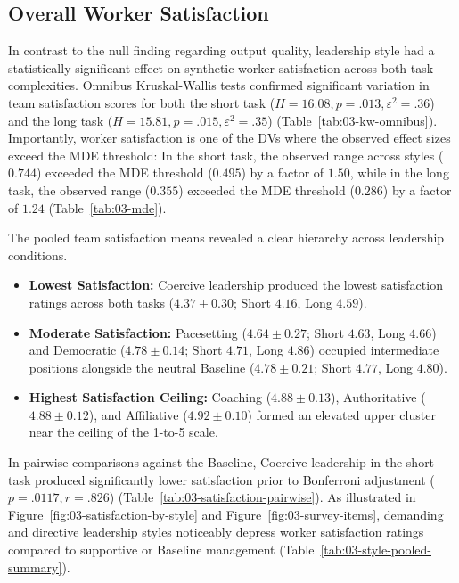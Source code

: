 \subsection{Overall Worker Satisfaction}
\label{subsec:overall-worker-satisfaction}

In contrast to the null finding regarding output quality, leadership style had a statistically significant effect on synthetic worker satisfaction across both task complexities.
Omnibus Kruskal-Wallis tests confirmed significant variation in team satisfaction scores for both the short task ($H = 16.08, p = .013, \varepsilon^2 = .36$) and the long task ($H = 15.81, p = .015, \varepsilon^2 = .35$) (Table~\ref{tab:03-kw-omnibus}).
Importantly, worker satisfaction is one of the \acp{DV} where the observed effect sizes exceed the \ac{MDE} threshold:
In the short task, the observed range across styles ($0.744$) exceeded the \ac{MDE} threshold ($0.495$) by a factor of $1.50$,
while in the long task, the observed range ($0.355$) exceeded the \ac{MDE} threshold ($0.286$) by a factor of $1.24$ (Table~\ref{tab:03-mde}).

The pooled team satisfaction means revealed a clear hierarchy across leadership conditions.
\begin{itemize}
    \item \textbf{Lowest Satisfaction:} Coercive leadership produced the lowest satisfaction ratings across both tasks ($4.37 \pm 0.30$; Short $4.16$, Long $4.59$).
    \item \textbf{Moderate Satisfaction:} Pacesetting ($4.64 \pm 0.27$; Short $4.63$, Long $4.66$) and Democratic ($4.78 \pm 0.14$; Short $4.71$, Long $4.86$) occupied intermediate positions alongside the neutral Baseline ($4.78 \pm 0.21$; Short $4.77$, Long $4.80$).
    \item \textbf{Highest Satisfaction Ceiling:} Coaching ($4.88 \pm 0.13$), Authoritative ($4.88 \pm 0.12$), and Affiliative ($4.92 \pm 0.10$) formed an elevated upper cluster near the ceiling of the 1-to-5 scale.
\end{itemize}
In pairwise comparisons against the Baseline, Coercive leadership in the short task produced significantly lower satisfaction prior to Bonferroni adjustment ($p = .0117, r = .826$) (Table~\ref{tab:03-satisfaction-pairwise}).
As illustrated in Figure~\ref{fig:03-satisfaction-by-style} and Figure~\ref{fig:03-survey-items}, demanding and directive leadership styles noticeably depress worker satisfaction ratings compared to supportive or Baseline management (Table~\ref{tab:03-style-pooled-summary}).

